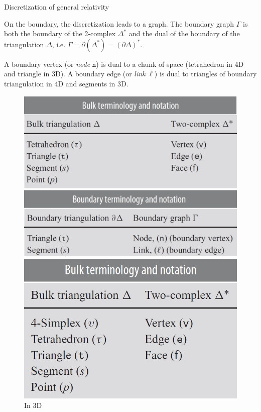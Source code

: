 \documentclass[12pt,titlepage]{article}
\begin{document}
\begin{frame}{Discretization of general relativity}
    \begin{list}{\,}{\leftmargin=1em \itemindent=0em}
        \item<1-> On the boundary, the discretization leads to a graph. The boundary graph $\Gamma$ is both the boundary of the 2-complex $\Delta^\text{*}$ and the dual of the boundary of the triangulation $\Delta$, i.e. $\Gamma=\partial\left(\Delta^\text{*}\right)=\left(\partial\Delta\right)^\text{*}$.
        \item<2-> A boundary vertex (or \textit{node} $\mathtt{n}$) is dual to a chunk of space (tetrahedron in 4D and triangle in 3D). A boundary edge (or \textit{link} $\ell$) is dual to triangles of boundary triangulation in 4D and segments in 3D.\FloatBarrier
        \begin{figure}[!ht]
            \begin{minipage}{0.56375\linewidth}
                \includegraphics[width=\linewidth]{4.7.png}
                \caption{In 3D}
            \end{minipage}
            \begin{minipage}{0.43625\linewidth}
                \includegraphics[width=\linewidth]{4.8.png}

\end{minipage}
\end{figure}
\end{list}
\end{frame}
\end{document}
